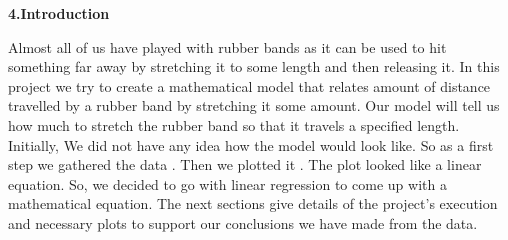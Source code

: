 \begin{center}
\textbf{{\huge 4.Introduction}}
\end{center}
\vspace{ 2 mm}
Almost all of us have played with rubber bands as it can be used to hit something far away by stretching it to some length and then releasing it. In this project we try to create a mathematical model that relates amount of distance travelled by a rubber band by stretching it some amount. Our model will tell us how much to stretch the rubber band so that it travels a specified length. Initially, We did not have any idea how the model would look like. So as a first step we gathered the data . Then we plotted it . The plot looked like a linear equation. So, we decided to go with linear regression to come up with a mathematical equation. The next sections give details of the project's execution and necessary plots to support our conclusions we have made from the data.\newline
\vspace{ 4 mm}
